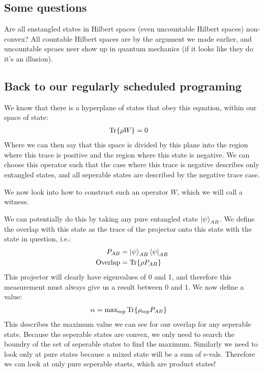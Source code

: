 \subsection*{Some questions}
Are all enstangled states in Hilbert spaces (even uncountable Hilbert spaces) non-convex? All countable Hilbert spaces are by the argument we made earlier, and uncountable spcaes neer show up in quantum mechanics (if it looks like they do it's an illusion).

\subsection*{Back to our regularly scheduled programing}
We know that there is a hyperplane of states that obey this equation, within our space of state:
\begin{align*}
	\Tr{\rho W} &= 0
\end{align*}
Where we can then say that this space is divided by this plane into the region where this trace is positive and the region where this state is negative.
We can choose this operator such that the case where this trace is negative describes only entangled states, and all seperable states are described by the negative trace case.

We now look into how to construct such an operator $W$, which we will call a witness. 

We can potentially do this by taking any pure entangled state $\ket{\psi}_{AB}$. We define the overlap with this state as the trace of the projector onto this state with the state in question, i.e.:
\begin{align*}
	P_{AB} &= \ket{\psi}_{AB}\bra{\psi}_{AB} \\
	\text{Overlap} &= \Tr{\rho P_{AB}}
\end{align*}
This projector will clearly have eigenvalues of 0 and 1, and therefore this measurement must always give us a result between 0 and 1. We now define a value:
\begin{align*}
	\alpha &= \text{max}_\text{sep} \Tr{\rho_\text{sep}P_{AB}}
\end{align*}
This describes the maximum value we can see for our overlap for any seperable state. Because the seperable states are convex, we only need to search the boundry of the set of seperable states to find the maximum.
Similarly we need to look only at pure states because a mixed state will be a sum of e-vals. Therefore we can look at only pure seperable staets, which are product states!


